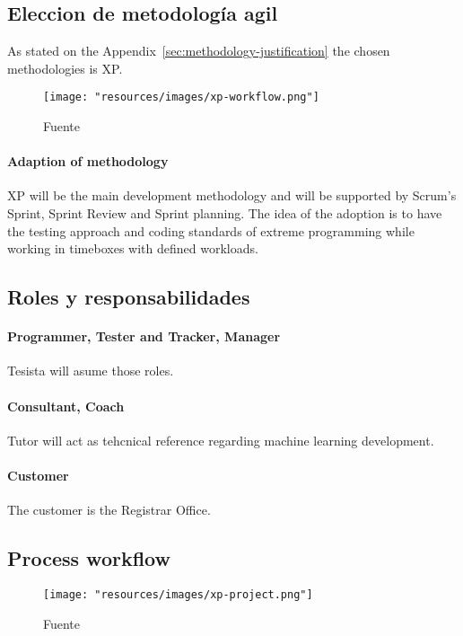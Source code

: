 \subsection{Eleccion de metodología agil}

As stated on the Appendix~\ref{sec:methodology-justification} the chosen methodologies is XP.

\begin{figure}
    \texttt{[image: "resources/images/xp-workflow.png"]}
    \caption{Fuente \textcite{abrahamsson2017agile}}\label{fig:xp-workflow}
\end{figure}

\paragraph{Adaption of methodology} XP will be the main development methodology and will be supported by Scrum's Sprint, Sprint Review and Sprint planning.
The idea of the adoption is to have the testing approach and coding standards of extreme programming while working in timeboxes with defined workloads.


\subsection{Roles y responsabilidades}

\paragraph{Programmer, Tester and Tracker, Manager} Tesista will asume those roles.

\paragraph{Consultant, Coach} Tutor will act as tehcnical reference regarding machine learning development.

\paragraph{Customer} The customer is the Registrar Office.

\subsection{Process workflow}

\begin{figure}
    \texttt{[image: "resources/images/xp-project.png"]}
    \caption{Fuente \textcite{XpWeb}}\label{fig:xp-project}
\end{figure}

